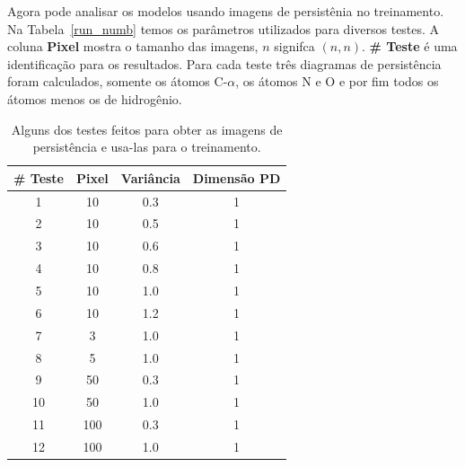 Agora pode analisar os modelos usando imagens de persistênia no treinamento. Na Tabela~\ref{run_numb} temos
os parâmetros utilizados para diversos testes. A coluna \textbf{Pixel} mostra o tamanho das imagens, $n$
signifca $(n,n)$. \textbf{\# Teste} é uma identificação para os resultados. Para cada teste três diagramas
de persistência foram calculados, somente os átomos C-$\alpha$, os átomos N e O e por fim todos os átomos
menos os de hidrogênio.

\begin{table}[!htbp]
    \centering
    \caption{Alguns dos testes feitos para obter as imagens de persistência e usa-las para o
             treinamento.}
    \label{tab:run_numb}
    \begin{tabular}{@{}cccc@{}}
    \toprule
    \textbf{\# Teste} & \textbf{Pixel} & \textbf{Variância} & \textbf{Dimensão PD} \\
    \midrule
    1                   & 10                  & 0.3             & 1                     \\
    2                   & 10                  & 0.5             & 1                     \\
    3                   & 10                  & 0.6             & 1                     \\
    4                   & 10                  & 0.8             & 1                     \\
    5                   & 10                  & 1.0             & 1                     \\
    6                   & 10                  & 1.2             & 1                     \\
    7                   & 3                   & 1.0             & 1                     \\
    8                   & 5                   & 1.0             & 1                     \\
    9                   & 50                  & 0.3             & 1                     \\
    10                  & 50                  & 1.0             & 1                     \\
    11                  & 100                 & 0.3             & 1                     \\
    12                  & 100                 & 1.0             & 1                     \\

\end{tabular}
\end{table}
